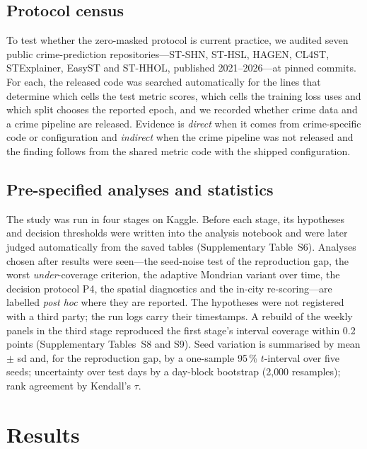 \documentclass[preprint,12pt,authoryear]{elsarticle}
\begin{document}
\subsection{Protocol census}\label{sec:census}
To test whether the zero-masked protocol is current practice, we audited seven public crime-prediction repositories---ST-SHN, ST-HSL, HAGEN, CL4ST, STExplainer, EasyST and ST-HHOL, published 2021--2026---at pinned commits. For each, the released code was searched automatically for the lines that determine which cells the test metric scores, which cells the training loss uses and which split chooses the reported epoch, and we recorded whether crime data and a crime pipeline are released. Evidence is \emph{direct} when it comes from crime-specific code or configuration and \emph{indirect} when the crime pipeline was not released and the finding follows from the shared metric code with the shipped configuration.

\subsection{Pre-specified analyses and statistics}\label{sec:prereg}
The study was run in four stages on Kaggle. Before each stage, its hypotheses and decision thresholds were written into the analysis notebook and were later judged automatically from the saved tables (Supplementary Table~S6). Analyses chosen after results were seen---the seed-noise test of the reproduction gap, the worst \emph{under}-coverage criterion, the adaptive Mondrian variant over time, the decision protocol P4, the spatial diagnostics and the in-city re-scoring---are labelled \emph{post hoc} where they are reported. The hypotheses were not registered with a third party; the run logs carry their timestamps. A rebuild of the weekly panels in the third stage reproduced the first stage's interval coverage within 0.2 points (Supplementary Tables~S8 and S9). Seed variation is summarised by mean $\pm$ sd and, for the reproduction gap, by a one-sample 95\,\% $t$-interval over five seeds; uncertainty over test days by a day-block bootstrap (2{,}000 resamples); rank agreement by Kendall's $\tau$.

\section{Results}\label{sec:results}
\end{document}
